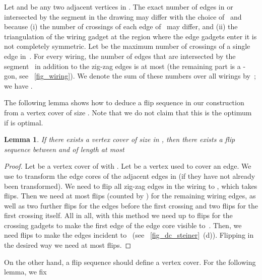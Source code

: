 \documentclass[11pt,a4paper]{article}
\newtheorem{lemma}[theorem]{Lemma}
\begin{document}
Let  and  be any two adjacent vertices in .
The exact number of edges in  or~ intersected by the segment  in the drawing may differ with the choice of~ and~ because (i) the number of crossings of each edge of~ may differ, and (ii) the triangulation of the wiring gadget at the region where the edge gadgets enter it is not completely symmetric.
Let  be the maximum number of crossings of a single edge in~.
For every wiring, the number of edges that are intersected by the segment~ in addition to the zig-zag edges is at most  (the remaining part is a -gon, see \figurename~\ref{fig_wiring}).
We denote the sum of these numbers over all wirings by~; we have .


The following lemma shows how to deduce a flip sequence in our construction from a vertex cover of size .
Note that we do not claim that this is the optimum if  is optimal.
\begin{lemma}\label{lem_flip_from_cover}
If there exists a vertex cover of size  in , then there exists a flip sequence between  and  of length at most

\end{lemma}
\begin{proof}
Let  be a vertex cover of  with .
Let  be a vertex used to cover an edge.
We use  to transform the edge cores of the adjacent edges in  (if they have not already been transformed).
We need to flip all zig-zag edges in the wiring to , which takes  flips.
Then we need at most  flips (counted by ) for the remaining wiring edges, as well as two further flips for the edges before the first crossing and two flips for the first crossing itself.
All in all, with this method we need up to  flips for the crossing gadgets to make the first edge of the edge core visible to~.
Then, we need  flips to make the edges incident to~ (see \figurename~\ref{fig_dc_steiner}~(d)).
Flipping in the desired way we need at most  flips.
\end{proof}


On the other hand, a flip sequence should define a vertex cover.
For the following lemma, we fix
\end{document}
